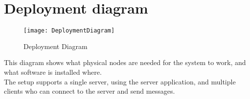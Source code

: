 \documentclass[Main]{subfiles}
\begin{document}
\section{Deployment diagram}
\begin{figure}[hbtp]
\centering
\texttt{[image: DeploymentDiagram]}
\caption{Deployment Diagram}
\label{fig:deploymentDiagram}
\end{figure}
This diagram shows what physical nodes are needed for the system to work, and what software is installed where.\\
The setup supports a single server, using the server application, and multiple clients who can connect to the server and send messages.
\end{document}
